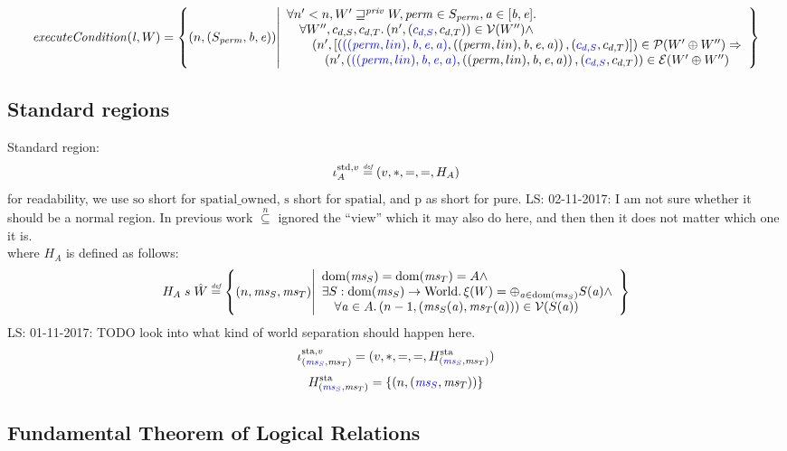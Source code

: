 \documentclass[a3paper]{article}
\newcommand\lau[1]{{\color{purple} \sf \footnotesize {LS: #1}}\\}
\newcommand{\defeq}{\stackrel{\textit{\tiny{def}}}{=}}
\newcommand{\dom}{\mathrm{dom}}
\newcommand{\npair}[2][n]{\left(#1,#2\right)}
\newcommand{\nsubeq}[1][n]{\overset{#1}{\subseteq}}
\newcommand{\fun}{\rightarrow}
\newcommand{\typesetlr}[1]{\mathcal{#1}}
\newcommand{\lre}{\typesetlr{E}}
\newcommand{\lrv}{\typesetlr{V}}
\newcommand{\lrp}{\typesetlr{P}}
\newcommand{\stpair}[3][]{
\ifthenelse{\equal{#1}{}}
{\left(\src{#2_S},#3_T\right)}
{\left(\src{#2},#3\right)}}
\newcommand{\World}{\mathrm{World}}
\newcommand{\spatial}{\mathrm{spatial}}
\newcommand{\spatialo}{\mathrm{spatial\_owned}}
\newcommand{\pure}{\mathrm{pure}}
\newcommand{\future}{\sqsupseteq}
\newcommand{\privft}{\future^{\priv}}
\newcommand{\stdreg}[2]{\iota^{\mathrm{std},#2}_{#1}}
\newcommand{\stareg}[2][\stpair{\ms}{\ms}]{\iota^{\mathrm{sta},#2}_{#1}}
\newcommand{\spa}{\mathrm{s}}
\newcommand{\spao}{\mathrm{so}}
\newcommand{\pur}{\mathrm{p}}
\newcommand{\sourcecolor}{\color{blue}}
\newcommand{\src}[1]{{\sourcecolor #1}}
\newcommand{\perm}{\var{perm}}
\newcommand{\lin}{\var{l}}
\newcommand{\var}[1]{\mathit{#1}}
\newcommand{\ms}{\var{ms}}
\newcommand{\priv}{\var{priv}}
\newcommand{\baddr}{\var{b}}
\newcommand{\eaddr}{\var{e}}
\newcommand{\aaddr}{\var{a}}
\newcommand{\plainlinearity}[1]{\mathrm{#1}}
\newcommand{\normal}{\plainlinearity{normal}}
\newcommand{\plainfun}[2]{
  \ifthenelse{\equal{#2}{}}
  {\mathit{#1}}
  {\mathit{#1}(#2)}
}
\newcommand{\execCond}[1]{\plainfun{executeCondition}{#1}}
\begin{document}
\[
  \execCond{\lin,W} = \left\{ \npair{(S_\perm,\baddr,\eaddr)} \middle|
    \begin{array}{l}
      \forall n' < n, W' \privft W, \perm \in S_\perm, \aaddr \in [\baddr,\eaddr] \ldotp\\
      \quad \forall W'', c_{d,S},c_{d,T} \ldotp \npair[n']{\stpair[.]{c_{d,S}}{c_{d,T}}} \in \lrv(W'') \wedge \\
      \qquad \npair[n']{[\stpair[.]{((\perm,lin),\baddr,\eaddr,\aaddr)}{((\perm,lin),\baddr,\eaddr,\aaddr)},\stpair[.]{c_{d,S}}{c_{d,T}}]} \in \lrp(W' \oplus W'') \Rightarrow \\
      \quad \qquad \npair[n']{\stpair[.]{((\perm,lin),\baddr,\eaddr,\aaddr)}{((\perm,lin),\baddr,\eaddr,\aaddr)},\stpair[.]{c_{d,S}}{c_{d,T}}} \in \lre(W' \oplus W'')
    \end{array}
    \right\}
\]


\subsection{Standard regions}
\label{sec:standard-regions}
Standard region:
\[
  \stdreg{A}{v} \defeq (v,*,=,=,H_A)
\]
for readability, we use $\spao$ short for $\spatialo$, $\spa$ short for $\spatial$, and $\pur$ as short for $\pure$.
\lau{02-11-2017: I am not sure whether it should be a $\normal$ region. In previous work $\nsubeq$ ignored the ``view'' which it may also do here, and then then it does not matter which one it is.}
where $H_A$ is defined as follows:
\[
  H_A \; s \; \hat{W} \defeq \left\{ \npair{\ms_S,\ms_T} \middle|
    \begin{array}{l}
      \dom(\ms_S) = \dom(\ms_T) = A \wedge \\
      \exists S : \dom(\ms_S) \fun \World \ldotp \xi(W) = \oplus_{\aaddr \in \dom(\ms_S)} S(\aaddr) \wedge\\
      \quad \forall \aaddr \in A \ldotp \npair[n-1]{(\ms_S(\aaddr),\ms_T(\aaddr))} \in \lrv(S(\aaddr))
    \end{array}
  \right\}
\]
\lau{01-11-2017: TODO look into what kind of world separation should happen here.}

\[
  \stareg{v} = (v,*,=,=,H^\mathrm{sta}_{\stpair{\ms}{\ms}})
\]
\[
  H^\mathrm{sta}_{\stpair{\ms}{\ms}} = \{ \npair{\stpair{\ms}{\ms}} \}
\]

\subsection{Fundamental Theorem of Logical Relations}
\end{document}
